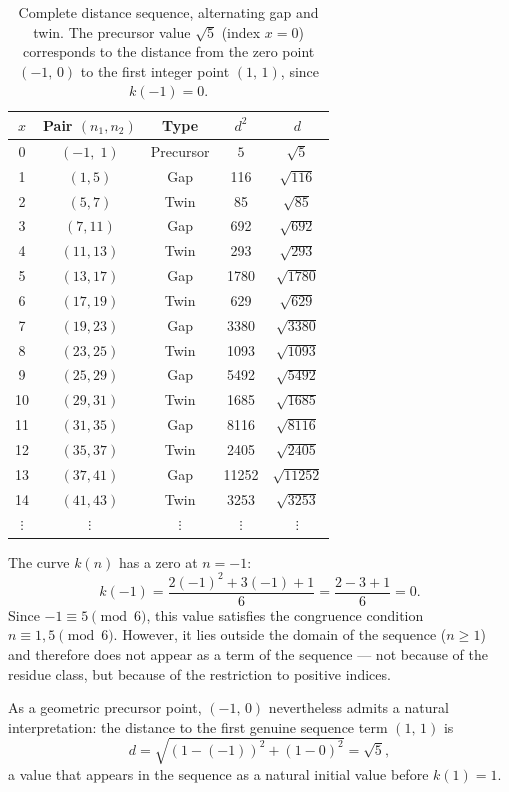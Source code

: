 \begin{table}[H]
\centering
\caption{Complete distance sequence, alternating gap and twin.
  The precursor value $\sqrt{5}$ (index $x=0$) corresponds to the distance
  from the zero point $(-1,\,0)$ to the first integer point $(1,\,1)$,
  since $k(-1) = 0$.}
\renewcommand{\arraystretch}{1.15}
\begin{tabular}{ccccc}
\toprule
$x$ & Pair $(n_1,n_2)$ & Type & $d^2$ & $d$ \\
\midrule
0 & $(-1,\; 1)$ & Precursor & $5$ & $\sqrt{5}$ \\
\midrule
1  & $( 1,  5)$ & Gap  & 116   & $\sqrt{116}$   \\
2  & $( 5,  7)$ & Twin & 85    & $\sqrt{85}$    \\
3  & $( 7, 11)$ & Gap  & 692   & $\sqrt{692}$   \\
4  & $(11, 13)$ & Twin & 293   & $\sqrt{293}$   \\
5  & $(13, 17)$ & Gap  & 1780  & $\sqrt{1780}$  \\
6  & $(17, 19)$ & Twin & 629   & $\sqrt{629}$   \\
7  & $(19, 23)$ & Gap  & 3380  & $\sqrt{3380}$  \\
8  & $(23, 25)$ & Twin & 1093  & $\sqrt{1093}$  \\
9  & $(25, 29)$ & Gap  & 5492  & $\sqrt{5492}$  \\
10 & $(29, 31)$ & Twin & 1685  & $\sqrt{1685}$  \\
11 & $(31, 35)$ & Gap  & 8116  & $\sqrt{8116}$  \\
12 & $(35, 37)$ & Twin & 2405  & $\sqrt{2405}$  \\
13 & $(37, 41)$ & Gap  & 11252 & $\sqrt{11252}$ \\
14 & $(41, 43)$ & Twin & 3253  & $\sqrt{3253}$  \\
$\vdots$ & $\vdots$ & $\vdots$ & $\vdots$ & $\vdots$ \\
\bottomrule
\end{tabular}
\end{table}

\begin{remark}
	The curve $k(n)$ has a zero at $n = -1$:
	\[
	k(-1) = \frac{2(-1)^2 + 3(-1) + 1}{6} = \frac{2 - 3 + 1}{6} = 0.
	\]
	Since $-1 \equiv 5 \pmod{6}$, this value satisfies the congruence condition
	$n \equiv 1, 5 \pmod{6}$. However, it lies outside the
	domain of the sequence ($n \geq 1$) and therefore does not appear
	as a term of the sequence --- not because of the residue class, but because
	of the restriction to positive indices.
	
	As a geometric precursor point, $(-1,\, 0)$ nevertheless admits a
	natural interpretation: the distance to the first genuine sequence term
	$(1,\, 1)$ is
	\[
	d = \sqrt{(1-(-1))^2 + (1-0)^2} = \sqrt{5},
	\]
	a value that appears in the sequence as a natural initial value before
	$k(1) = 1$.
\end{remark}

